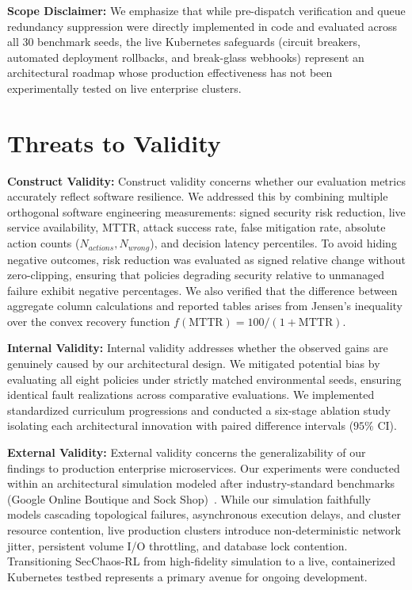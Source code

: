 \documentclass[ASNA,twocolumn]{USG}
\begin{document}
\textbf{Scope Disclaimer:} We emphasize that while pre-dispatch verification and queue redundancy suppression were directly implemented in code and evaluated across all 30 benchmark seeds, the live Kubernetes safeguards (circuit breakers, automated deployment rollbacks, and break-glass webhooks) represent an architectural roadmap whose production effectiveness has not been experimentally tested on live enterprise clusters.

\section{Threats to Validity}
\label{sec:validity}

\textbf{Construct Validity:} Construct validity concerns whether our evaluation metrics accurately reflect software resilience. We addressed this by combining multiple orthogonal software engineering measurements: signed security risk reduction, live service availability, MTTR, attack success rate, false mitigation rate, absolute action counts ($N_{actions}, N_{wrong}$), and decision latency percentiles. To avoid hiding negative outcomes, risk reduction was evaluated as signed relative change without zero-clipping, ensuring that policies degrading security relative to unmanaged failure exhibit negative percentages. We also verified that the difference between aggregate column calculations and reported tables arises from Jensen's inequality over the convex recovery function $f(\text{MTTR}) = 100 / (1 + \text{MTTR})$.

\textbf{Internal Validity:} Internal validity addresses whether the observed gains are genuinely caused by our architectural design. We mitigated potential bias by evaluating all eight policies under strictly matched environmental seeds, ensuring identical fault realizations across comparative evaluations. We implemented standardized curriculum progressions and conducted a six-stage ablation study isolating each architectural innovation with paired difference intervals ($95\%$ CI).

\textbf{External Validity:} External validity concerns the generalizability of our findings to production enterprise microservices. Our experiments were conducted within an architectural simulation modeled after industry-standard benchmarks (Google Online Boutique and Sock Shop)~\cite{aderaldo2025declarative, soldani2023microservice}. While our simulation faithfully models cascading topological failures, asynchronous execution delays, and cluster resource contention, live production clusters introduce non-deterministic network jitter, persistent volume I/O throttling, and database lock contention. Transitioning SecChaos-RL from high-fidelity simulation to a live, containerized Kubernetes testbed represents a primary avenue for ongoing development.
\end{document}
